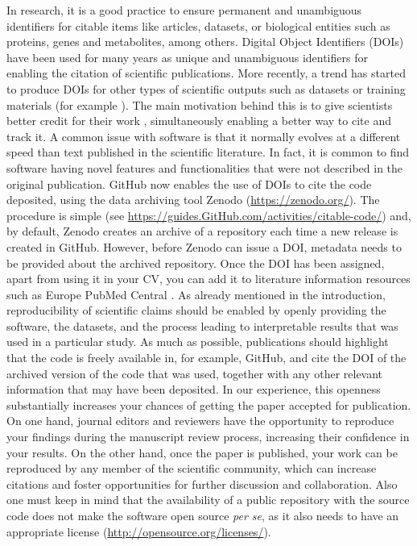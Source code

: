 \documentclass[10pt,letterpaper]{article}
\begin{document}
In research, it is a good practice to ensure permanent and unambiguous
identifiers for citable items like articles, datasets, or biological
entities such as proteins, genes and metabolites, among others. Digital
Object Identifiers (DOIs) have been used for many years as unique and
unambiguous identifiers for enabling the citation of scientific
publications. More recently, a trend has started to produce DOIs for
other types of scientific outputs such as datasets \cite{Vizcaino:2014}
or training materials (for example \cite{Ahmadia_2015_27353}). The main
motivation behind this is to give scientists better credit for their
work \cite{NatBiotechEditorial:2009}, simultaneously enabling a better
way to cite and track it. A common issue with software is that it
normally evolves at a different speed than text published in the
scientific literature. In fact, it is common to find software having
novel features and functionalities that were not described in the
original publication. GitHub now enables the use of DOIs to cite the
code deposited, using the data archiving tool Zenodo
(\url{https://zenodo.org/}). The procedure is simple (see
\url{https://guides.GitHub.com/activities/citable-code/}) and, by default,
Zenodo creates an archive of a repository each time a new release is
created in GitHub. However, before Zenodo can issue a DOI, metadata
needs to be provided about the archived repository. Once the DOI has
been assigned, apart from using it in your CV, you can add it to
literature information resources such as Europe PubMed Central
\cite{EuropePMCConsortium:2015}. As already mentioned in the
introduction, reproducibility of scientific claims should be enabled by
openly providing the software, the datasets, and the process leading to
interpretable results that was used in a particular study. As much as possible,
publications should highlight that the code is
freely available in, for example, GitHub, and cite the DOI of the archived version
of the code that was used, together with any other
relevant information that may have been deposited. In our
experience, this openness substantially increases your chances of
getting the paper accepted for publication. On one hand, journal editors
and reviewers have the opportunity to reproduce your findings during the
manuscript review process, increasing their confidence in your results. On
the other hand, once the paper is published, your work can be reproduced
by any member of the scientific community, which can increase citations
and foster opportunities for further discussion and collaboration. Also
one must keep in mind that the availability of a public repository with
the source code does not make the software open source \emph{per se}, as
it also needs to have an appropriate license
(\url{http://opensource.org/licenses/}).
\end{document}
